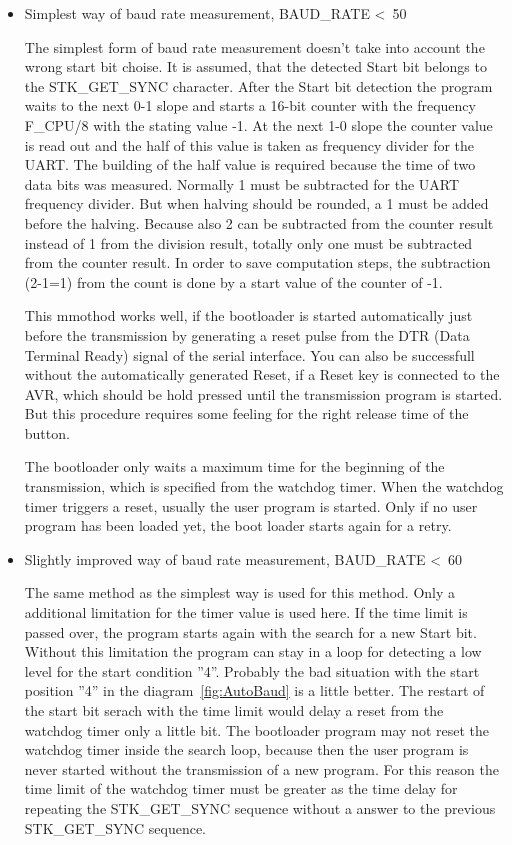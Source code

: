 \begin{itemize}

\item {Simplest way of baud rate measurement, BAUD\_RATE \textless~50}

The simplest form of baud rate measurement doesn't take into account
the wrong start bit choise.
It is assumed, that the detected Start bit belongs to the STK\_GET\_SYNC
character.
After the Start bit detection the program waits to the next 0-1 slope
and starts a 16-bit counter with the frequency F\_CPU/8 with the
stating value -1. At the next 1-0 slope the counter value is read out
and the half of this value is taken as frequency divider for the UART.
The building of the half value is required because the time of two data bits
was measured.
Normally 1 must be subtracted for the UART frequency divider.
But when halving should be rounded, a 1 must be added before the halving.
Because also 2 can be subtracted from the counter result instead of
1 from the division result, totally only one must be subtracted from the
counter result. In order to save computation steps, the subtraction (2-1=1)
from the count is done by a start value of the counter of -1.

This mmothod works well, if the bootloader is started automatically just
before the transmission by generating a reset pulse from the DTR (Data Terminal Ready)
signal of the serial interface.
You can also be successfull without the automatically generated Reset,
if a Reset key is connected to the AVR, which should be hold pressed
until the transmission program is started.
But this procedure requires some feeling for the right release time
of the button.

The bootloader only waits a maximum time for the beginning of the transmission,
which is specified from the watchdog timer.
When the watchdog timer triggers a reset, usually the user program is started.
Only if no user program has been loaded yet, the boot loader starts again for a retry.

\item {Slightly improved way of baud rate measurement, BAUD\_RATE \textless~60}

The same method as the simplest way is used for this method.
Only a additional limitation for the timer value is used here.
If the time limit is passed over, the program starts again with the search
for a new Start bit.
Without this limitation the program can stay in a loop for detecting
a low level for the start condition ''4''. 
Probably the bad situation with the start position ''4'' in the 
diagram~\ref{fig:AutoBaud} is a little better. 
The restart of the start bit serach with the time limit would
delay a reset from the watchdog timer only a little bit.
The bootloader program may not reset the watchdog timer inside
the search loop, because then the user program is never started
without the transmission of a new program.
For this reason the time limit of the watchdog timer must be greater
as the time delay for repeating the STK\_GET\_SYNC sequence
without a answer to the previous STK\_GET\_SYNC sequence.



\end{itemize}
